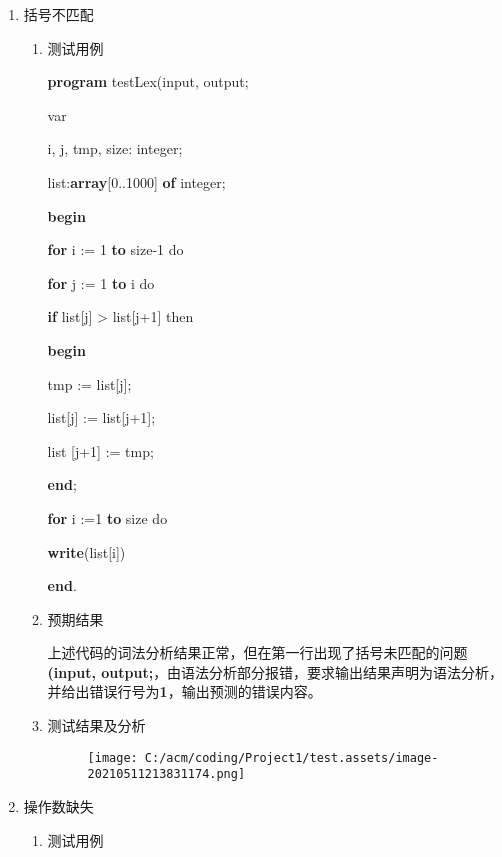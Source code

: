\documentclass[]{ctexart}
\newenvironment{Shaded}{}{}
\newcommand{\DataTypeTok}[1]{\textcolor[rgb]{0.56,0.13,0.00}{#1}}
\newcommand{\DecValTok}[1]{\textcolor[rgb]{0.25,0.63,0.44}{#1}}
\newcommand{\KeywordTok}[1]{\textcolor[rgb]{0.00,0.44,0.13}{\textbf{#1}}}
\newcommand{\NormalTok}[1]{#1}
\begin{document}
\begin{enumerate}
\def\labelenumi{\arabic{enumi}.}
\item
  括号不匹配

  \begin{enumerate}
  \def\labelenumii{\arabic{enumii}.}
  \item
    测试用例

\begin{Shaded}
\begin{Highlighting}[]
\KeywordTok{program}\NormalTok{ testLex(input, output;
}
\NormalTok{var
}
\NormalTok{	i, j, tmp, size: }\DataTypeTok{integer}\NormalTok{;
}
\NormalTok{	list:}\KeywordTok{array}\NormalTok{[}\DecValTok{0}\NormalTok{..}\DecValTok{1000}\NormalTok{] }\KeywordTok{of} \DataTypeTok{integer}\NormalTok{;
}
\KeywordTok{begin}

    \KeywordTok{for}\NormalTok{ i := }\DecValTok{1} \KeywordTok{to}\NormalTok{ size}\DecValTok{-1}\NormalTok{ do
}
	\KeywordTok{for}\NormalTok{ j := }\DecValTok{1} \KeywordTok{to}\NormalTok{ i do
}
	    \KeywordTok{if}\NormalTok{ list[j] > list[j+}\DecValTok{1}\NormalTok{] then
}
	    \KeywordTok{begin}

\NormalTok{		    tmp := list[j];
}
\NormalTok{		    list[j] := list[j+}\DecValTok{1}\NormalTok{];
}
\NormalTok{		    list [j+}\DecValTok{1}\NormalTok{] := tmp;
}
	    \KeywordTok{end}\NormalTok{;
}


    \KeywordTok{for}\NormalTok{ i :=}\DecValTok{1} \KeywordTok{to}\NormalTok{ size do
}
	\KeywordTok{write}\NormalTok{(list[i])
}
\KeywordTok{end}\NormalTok{.}
\end{Highlighting}
\end{Shaded}
  \item
    预期结果

    上述代码的词法分析结果正常，但在第一行出现了括号未匹配的问题
    \textbf{(input,
    output;}，由语法分析部分报错，要求输出结果声明为语法分析，并给出错误行号为\textbf{1}，输出预测的错误内容。
  \item
    测试结果及分析

    \begin{figure}
    \centering
    \texttt{[image: C:/acm/coding/Project1/test.assets/image-20210511213831174.png]}
    \caption{}
    \end{figure}
  \end{enumerate}
\item
  操作数缺失

  \begin{enumerate}
  \def\labelenumii{\arabic{enumii}.}
  \item
    测试用例


\end{enumerate}
\end{enumerate}
\end{document}
